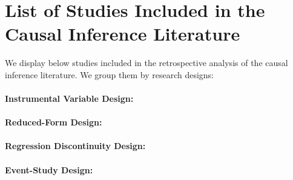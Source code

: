 \documentclass[12pt]{article}
\begin{document}


        
\singlespacing
\setlength\bibsep{0pt}


\onehalfspacing

\pagebreak




\appendix

\section{List of Studies Included in the Causal Inference Literature} \label{causal_lit}
\setcounter{figure}{0}
\renewcommand\thefigure{\thesection.\arabic{figure}}   


We display below studies included in the retrospective analysis of the causal inference literature. We group them by research designs:

\singlespacing
\paragraph{Instrumental Variable Design:} \cite{moretti_pollution_2011, ebenstein_particulate_2015, schwartz_estimating_2015, arceo_does_2016, he_effect_2016, knittel_caution_2016, schlenker_airports_2016, sheldon_impact_2017, schwartz_estimating_2017, zhong_traffic_2017, barwick_morbidity_2018, hanlon2018london, schwartz_national_2018, halliday_vog_2019, deryugina_mortality_2019, cheung_mitigating_2020, fan_impact_2020, he_straw_2020, giaccherini_when_2021, godzinski_disentangling_2021, guidetti_placebo_2021, kim_air_2021, liu_effect_2021, xia_short-term_2022}

\paragraph{Reduced-Form Design:} \cite{bauernschuster_when_2017, jans_economic_2018, jia_is_2019, godzinski2019short}

\begin{sloppypar}
\paragraph{Regression Discontinuity Design:} \cite{chen_air_2018, fan_winter_2020, anderson2022bounds}


\paragraph{Event-Study Design:} \cite{mullins_effects_2015, simeonova_congestion_2021}
\end{sloppypar}
\end{document}
